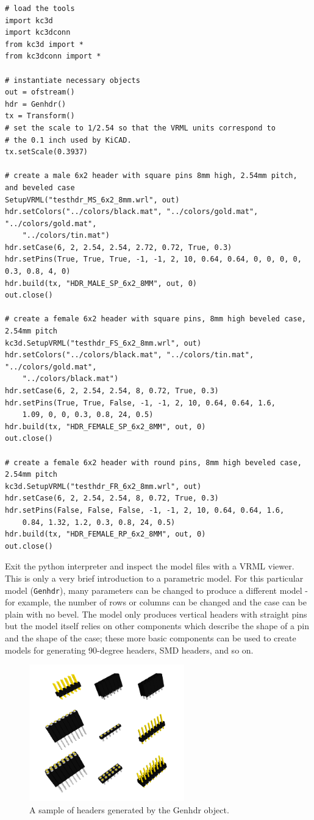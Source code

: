 \begin{verbatim}
# load the tools
import kc3d
import kc3dconn
from kc3d import *
from kc3dconn import *

# instantiate necessary objects
out = ofstream()
hdr = Genhdr()
tx = Transform()
# set the scale to 1/2.54 so that the VRML units correspond to
# the 0.1 inch used by KiCAD.
tx.setScale(0.3937)

# create a male 6x2 header with square pins 8mm high, 2.54mm pitch, and beveled case
SetupVRML("testhdr_MS_6x2_8mm.wrl", out)
hdr.setColors("../colors/black.mat", "../colors/gold.mat", "../colors/gold.mat",
    "../colors/tin.mat")
hdr.setCase(6, 2, 2.54, 2.54, 2.72, 0.72, True, 0.3)
hdr.setPins(True, True, True, -1, -1, 2, 10, 0.64, 0.64, 0, 0, 0, 0, 0.3, 0.8, 4, 0)
hdr.build(tx, "HDR_MALE_SP_6x2_8MM", out, 0)
out.close()

# create a female 6x2 header with square pins, 8mm high beveled case, 2.54mm pitch
kc3d.SetupVRML("testhdr_FS_6x2_8mm.wrl", out)
hdr.setColors("../colors/black.mat", "../colors/tin.mat", "../colors/gold.mat",
    "../colors/black.mat")
hdr.setCase(6, 2, 2.54, 2.54, 8, 0.72, True, 0.3)
hdr.setPins(True, True, False, -1, -1, 2, 10, 0.64, 0.64, 1.6,
    1.09, 0, 0, 0.3, 0.8, 24, 0.5)
hdr.build(tx, "HDR_FEMALE_SP_6x2_8MM", out, 0)
out.close()

# create a female 6x2 header with round pins, 8mm high beveled case, 2.54mm pitch
kc3d.SetupVRML("testhdr_FR_6x2_8mm.wrl", out)
hdr.setCase(6, 2, 2.54, 2.54, 8, 0.72, True, 0.3)
hdr.setPins(False, False, False, -1, -1, 2, 10, 0.64, 0.64, 1.6,
    0.84, 1.32, 1.2, 0.3, 0.8, 24, 0.5)
hdr.build(tx, "HDR_FEMALE_RP_6x2_8MM", out, 0)
out.close()
\end{verbatim}

Exit the python interpreter and inspect the model files with a VRML viewer.
This is only a very brief introduction to a parametric model. For this
particular model (\verb#Genhdr#), many parameters can be changed to produce
a different model - for example, the number of rows or columns can be changed
and the case can be plain with no bevel. The model only produces vertical
headers with straight pins but the model itself relies on other components
which describe the shape of a pin and the shape of the case; these more
basic components can be used to create models for generating 90-degree
headers, SMD headers, and so on.

\begin{figure}
\label{fig:k3dintro-headers}
\centering
\includegraphics[width = 0.6\textwidth]{img/k3dintro-headers.png}
\caption{A sample of headers generated by the Genhdr object.}
\end{figure}
